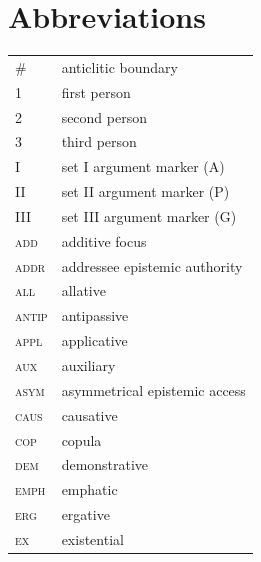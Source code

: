 \documentclass[output=paper,colorlinks,citecolor=brown]{langscibook}
\begin{document}
\section*{Abbreviations}
\begin{tabularx}{.5\textwidth}{lQ}
\# & anticlitic boundary \\
1 & first person \\
2 & second person \\
3 & third person \\
I & set I argument marker (A) \\
II & set II argument marker (P) \\
III & set III argument marker (G) \\
\scshape add & additive focus \\
\scshape addr & addressee epistemic authority \\
\scshape all & allative \\
\scshape antip & antipassive \\
\scshape appl & applicative \\
\scshape aux & auxiliary \\
\scshape asym & asymmetrical epistemic access \\
\scshape caus & causative \\
\scshape cop & copula \\
\scshape dem & demonstrative \\
\scshape emph & emphatic \\
\scshape erg & ergative \\
\scshape ex & existential \\
\end{tabularx}
\end{document}
